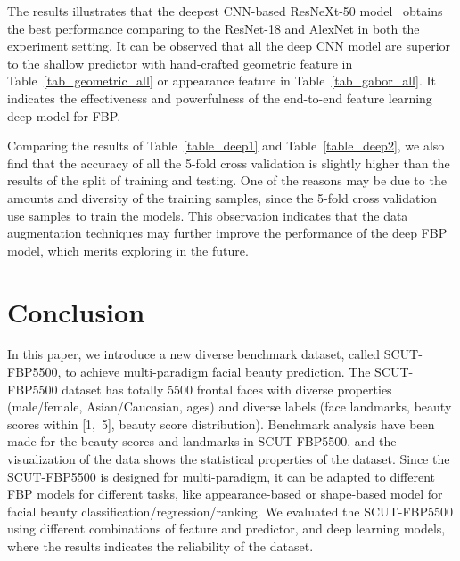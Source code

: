 \documentclass[10pt,conference,a4paper]{IEEEtran}
\begin{document}
The results illustrates that the deepest CNN-based ResNeXt-50 model~\cite{xie2016aggregated} obtains the best performance comparing to the ResNet-18 and AlexNet in both the experiment setting. It can be observed that all the deep CNN model are superior to the shallow predictor with hand-crafted geometric feature in Table~\ref{tab_geometric_all} or appearance feature in Table~\ref{tab_gabor_all}. It indicates the effectiveness and powerfulness of the end-to-end feature learning deep model for FBP.

Comparing the results of Table~\ref{table_deep1} and Table~\ref{table_deep2}, we also find that the accuracy of all the 5-fold cross validation is slightly higher than the results of the split of  training and  testing. One of the reasons may be due to the amounts and diversity of the training samples, since the 5-fold cross validation use  samples to train the models. This observation indicates that the data augmentation techniques may further improve the performance of the deep FBP model, which merits exploring in the future.


\section{Conclusion}
In this paper, we introduce a new diverse benchmark dataset, called SCUT-FBP5500, to achieve multi-paradigm facial beauty prediction. The SCUT-FBP5500 dataset has totally 5500 frontal faces with diverse properties (male/female, Asian/Caucasian, ages) and diverse labels (face landmarks, beauty scores within [1,~5], beauty score distribution). Benchmark analysis have been made for the beauty scores and landmarks in SCUT-FBP5500, and the visualization of the data shows the statistical properties of the dataset. Since the SCUT-FBP5500 is designed for multi-paradigm, it can be adapted to different FBP models for different tasks, like appearance-based or shape-based model for facial beauty classification/regression/ranking. We evaluated the SCUT-FBP5500 using different combinations of feature and predictor, and deep learning models, where the results indicates the reliability of the dataset.

















\balance
\end{document}
